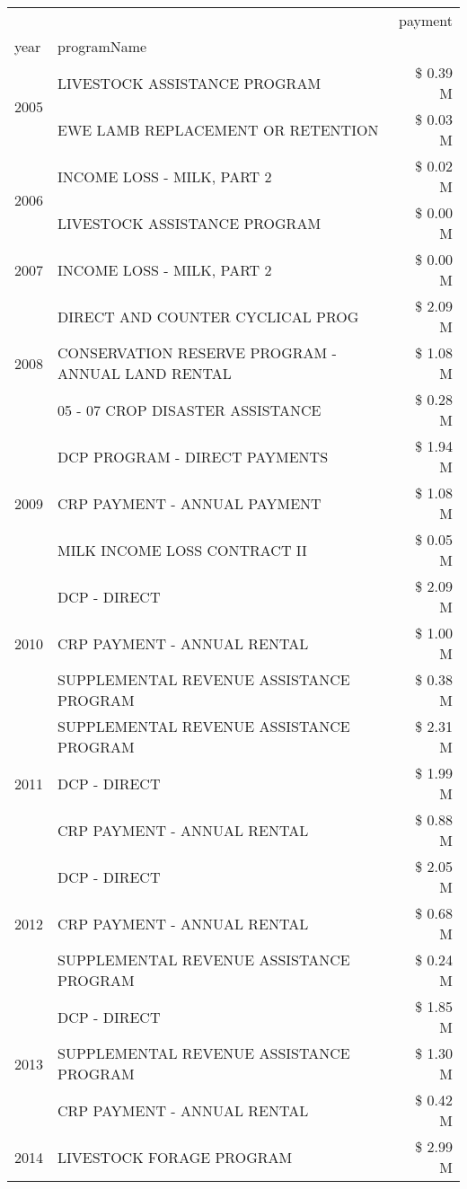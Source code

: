 \begin{tabular}{llr}
\toprule
 &  & payment \\
year & programName &  \\
\midrule
\multirow[t]{2}{*}{2005} & LIVESTOCK ASSISTANCE PROGRAM & \$ 0.39 M \\
 & EWE LAMB REPLACEMENT OR RETENTION & \$ 0.03 M \\
\cline{1-3}
\multirow[t]{2}{*}{2006} & INCOME LOSS - MILK, PART 2 & \$ 0.02 M \\
 & LIVESTOCK ASSISTANCE PROGRAM & \$ 0.00 M \\
\cline{1-3}
2007 & INCOME LOSS - MILK, PART 2 & \$ 0.00 M \\
\cline{1-3}
\multirow[t]{3}{*}{2008} & DIRECT AND COUNTER CYCLICAL PROG & \$ 2.09 M \\
 & CONSERVATION RESERVE PROGRAM - ANNUAL LAND RENTAL & \$ 1.08 M \\
 & 05 - 07 CROP DISASTER ASSISTANCE & \$ 0.28 M \\
\cline{1-3}
\multirow[t]{3}{*}{2009} & DCP PROGRAM - DIRECT PAYMENTS & \$ 1.94 M \\
 & CRP PAYMENT - ANNUAL PAYMENT & \$ 1.08 M \\
 & MILK INCOME LOSS CONTRACT II & \$ 0.05 M \\
\cline{1-3}
\multirow[t]{3}{*}{2010} & DCP - DIRECT & \$ 2.09 M \\
 & CRP PAYMENT - ANNUAL RENTAL & \$ 1.00 M \\
 & SUPPLEMENTAL REVENUE ASSISTANCE PROGRAM & \$ 0.38 M \\
\cline{1-3}
\multirow[t]{3}{*}{2011} & SUPPLEMENTAL REVENUE ASSISTANCE PROGRAM & \$ 2.31 M \\
 & DCP - DIRECT & \$ 1.99 M \\
 & CRP PAYMENT - ANNUAL RENTAL & \$ 0.88 M \\
\cline{1-3}
\multirow[t]{3}{*}{2012} & DCP - DIRECT & \$ 2.05 M \\
 & CRP PAYMENT - ANNUAL RENTAL & \$ 0.68 M \\
 & SUPPLEMENTAL REVENUE ASSISTANCE PROGRAM & \$ 0.24 M \\
\cline{1-3}
\multirow[t]{3}{*}{2013} & DCP - DIRECT & \$ 1.85 M \\
 & SUPPLEMENTAL REVENUE ASSISTANCE PROGRAM & \$ 1.30 M \\
 & CRP PAYMENT - ANNUAL RENTAL & \$ 0.42 M \\
\cline{1-3}
\multirow[t]{3}{*}{2014} & LIVESTOCK FORAGE PROGRAM & \$ 2.99 M \\

\end{tabular}
